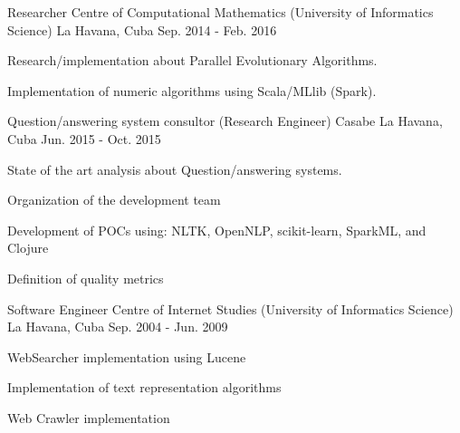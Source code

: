 


\begin{cventries}


\cventry
{Researcher} %
{Centre of Computational Mathematics (University of Informatics Science)} %
{La Havana, Cuba} %
{Sep. 2014 - Feb. 2016} %
{ %
\begin{cvitems}
\item {Research/implementation about Parallel Evolutionary Algorithms.}
\item {Implementation of numeric algorithms using Scala/MLlib (Spark).}
\end{cvitems}
}


\cventry
{Question/answering system consultor (Research Engineer)} %
{Casabe} %
{La Havana, Cuba} %
{Jun. 2015 - Oct. 2015} %
{ %
\begin{cvitems}
\item {State of the art analysis about Question/answering systems.}
\item {Organization of the development team}
\item {Development of POCs using: NLTK, OpenNLP, scikit-learn, SparkML, and Clojure}
\item {Definition of quality metrics}
\end{cvitems}
}


\cventry
{Software Engineer} %
{Centre of Internet Studies (University of Informatics Science)} %
{La Havana, Cuba} %
{Sep. 2004 - Jun. 2009} %
{ %
\begin{cvitems}
\item {WebSearcher implementation using Lucene}
\item {Implementation of text representation algorithms}
\item {Web Crawler implementation}
\end{cvitems} 
}


\end{cventries}
